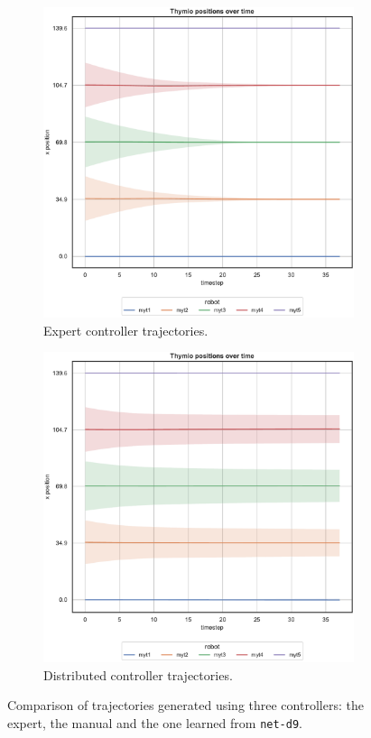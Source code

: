 \begin{figure}[!htb]
	\begin{center}
		\begin{subfigure}[h]{0.49\textwidth}
			\centering
			\includegraphics[width=.95\textwidth]{contents/images/net-d9/position-overtime-omniscient}%
			\caption{Expert controller trajectories.}
		\end{subfigure}
		\hfill
		\begin{subfigure}[h]{0.49\textwidth}
			\centering
			\includegraphics[width=.95\textwidth]{contents/images/net-d9/position-overtime-learned_distributed}
			\caption{Distributed controller trajectories.}
		\end{subfigure}
	\end{center}
	\caption[Evaluation of the trajectories learned by 
	\texttt{net-d9}.]{Comparison of trajectories generated using three controllers: 
	the expert, the manual and the one learned from \texttt{net-d9}.}
\end{figure}
